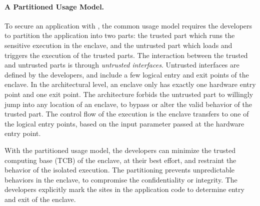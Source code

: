 \paragraph{A Partitioned Usage Model.}
To secure an application with \sgx{},
the common usage model requires the developers to partition the application into two parts:
the trusted part which runs the sensitive execution in the enclave,
and the untrusted part which loads and triggers the execution of the trusted parts.
The interaction between the trusted and untrusted parts is through \emph{untrusted interfaces}.
Untrusted interfaces are defined by the developers, and include a few
logical entry and exit points of the enclave.
In the architectural level,
an enclave only has exactly one hardware entry point and one exit point.
The architecture forbids the untrusted part
to willingly jump into any location of an enclave,
to bypass or alter the valid behavior of the trusted part.
The control flow of the execution is the enclave transfers to one of the logical entry points,
based on the input parameter passed
at the hardware entry point.

With the partitioned usage model,
the developers can minimize the trusted computing base (TCB) of the enclave,
at their best effort,
and restraint the behavior of the isolated execution.
The partitioning prevents unpredictable behaviors in the enclave,
to compromise the confidentiality or integrity.
The developers explicitly mark the sites in the application code
to determine entry and exit of the enclave.



